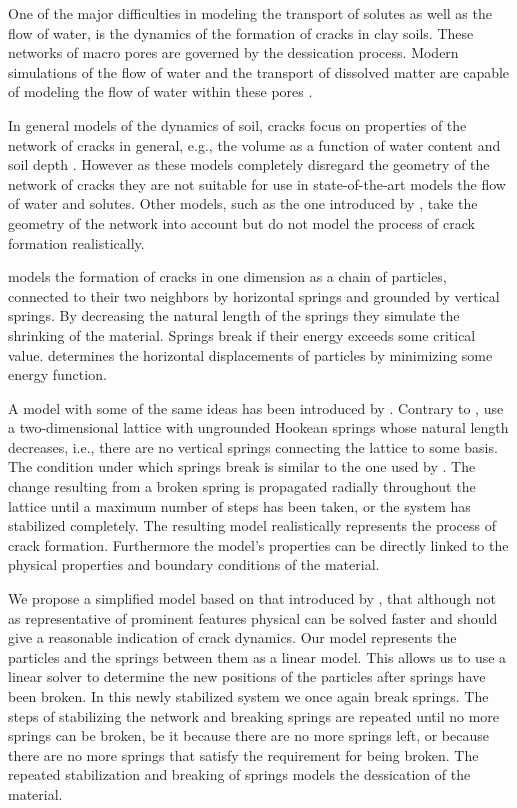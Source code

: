 One of the major difficulties in modeling the transport of solutes as well as the flow of water, is the dynamics of the formation of cracks in clay soils. These networks of macro pores are governed by the dessication process. Modern simulations of the flow of water and the transport of dissolved matter are capable of modeling the flow of water within these pores \cite{vogel2005studies2}.

In general models of the dynamics of soil, cracks focus on properties of the network of cracks in general, e.g., the volume as a function of water content and soil depth \cite{chertkov2000using}. However as these models completely disregard the geometry of the network of cracks they are not suitable for use in state-of-the-art models the flow of water and solutes. Other models, such as the one introduced by \textcite{horgan2000empirical}, take the geometry of the network into account but do not model the process of crack formation realistically. 

\textcite{kitsunezaki1999fracture} models the formation of cracks in one dimension as a chain of particles, connected to their two neighbors by horizontal springs and grounded by vertical springs. By decreasing the natural length of the springs they simulate the shrinking of the material. Springs break if their energy exceeds some critical value. \citeauthor{kitsunezaki1999fracture} determines the horizontal displacements of particles by minimizing some energy function. 

A model with some of the same ideas has been introduced by \textcite{vogel2005studies2}. Contrary to \citeauthor{kitsunezaki1999fracture}, \citeauthor{vogel2005studies2} use a two-dimensional lattice with ungrounded Hookean springs whose natural length decreases, i.e., there are no vertical springs connecting the lattice to some basis.  The condition under which springs break is similar to the one used by \citeauthor{kitsunezaki1999fracture}. The change resulting from a broken spring is propagated radially throughout the lattice until a maximum number of steps has been taken, or the system has stabilized completely. The resulting model realistically represents the process of crack formation. Furthermore the model's properties can be directly linked to the physical properties and boundary conditions of the material.

We propose a simplified model based on that introduced by \citeauthor{vogel2005studies2}, that although not as representative of prominent features physical can be solved faster and should give a reasonable indication of crack dynamics. Our model represents the particles and the springs between them as a linear model. This allows us to use a linear solver to determine the new positions of the particles after springs have been broken. In this newly stabilized system we once again break springs. The steps of stabilizing the network and breaking springs are repeated until no more springs can be broken, be it because there are no more springs left, or because there are no more springs that satisfy the requirement for being broken. The repeated stabilization and breaking of springs models the dessication of the material.

